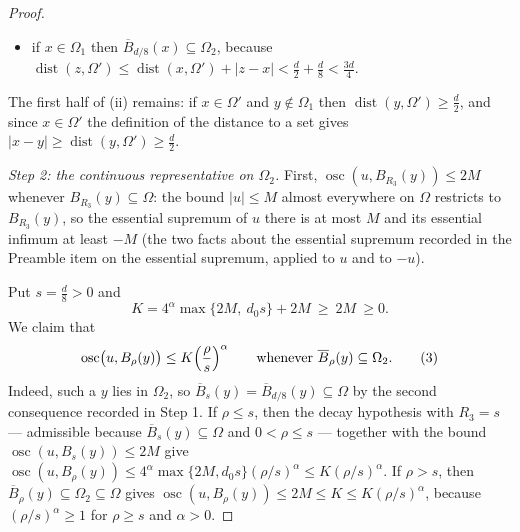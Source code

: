 \begin{proof}
\begin{itemize}
  place of $\frac{3d}4$.  Together with the first item this gives
  $\overline{\Omega_1}\subseteq\Omega$.  Also
  $\overline{\Omega'}\subseteq\Omega_1$, since every point of
  $\overline{\Omega'}$ has distance $0$ from $\Omega'$; with the boundedness of
  $\Omega_1$ and $\overline{\Omega_1}\subseteq\Omega$ this is (i).
\item if $x\in\Omega_1$ then $\overline B_{d/8}(x)\subseteq\Omega_2$, because
  $\operatorname{dist}(z,\Omega')\le\operatorname{dist}(x,\Omega')+|z-x|
  <\frac d2+\frac d8<\frac{3d}4$.
\end{itemize}
The first half of (ii) remains: if $x\in\Omega'$ and $y\notin\Omega_1$ then
$\operatorname{dist}(y,\Omega')\ge\frac d2$, and since $x\in\Omega'$ the
definition of the distance to a set gives
$|x-y|\ge\operatorname{dist}(y,\Omega')\ge\frac d2$.

\emph{Step 2: the continuous representative on $\Omega_2$.}  First,
$\operatorname*{osc}(u,B_{R_3}(y))\le2M$ whenever $B_{R_3}(y)\subseteq\Omega$:
the bound $|u|\le M$ almost everywhere on $\Omega$ restricts to $B_{R_3}(y)$,
so the essential supremum of $u$ there is at most $M$ and its essential infimum
at least $-M$ (the two facts about the essential supremum recorded in the
Preamble item on the essential supremum, applied to $u$ and to $-u$).

Put $s=\frac d8>0$ and
\[
K=4^\alpha\max\{2M,\ d_0s\}+2M\ \ge\ 2M\ \ge0 .
\]
We claim that
\[
\operatorname*{osc}\bigl(u,B_\rho(y)\bigr)\le K\Bigl(\frac\rho s\Bigr)^\alpha
\qquad\text{whenever }\overline B_\rho(y)\subseteq\Omega_2 .
\tag{3}
\]
Indeed, such a $y$ lies in $\Omega_2$, so
$\overline B_s(y)=\overline B_{d/8}(y)\subseteq\Omega$ by the second
consequence recorded in Step 1.  If $\rho\le s$, then the decay hypothesis with
$R_3=s$ --- admissible because $\overline B_s(y)\subseteq\Omega$ and
$0<\rho\le s$ --- together with the bound
$\operatorname*{osc}(u,B_s(y))\le2M$ give
$\operatorname*{osc}(u,B_\rho(y))\le4^\alpha\max\{2M,d_0s\}(\rho/s)^\alpha
\le K(\rho/s)^\alpha$.  If $\rho>s$, then
$\overline B_\rho(y)\subseteq\Omega_2\subseteq\Omega$ gives
$\operatorname*{osc}(u,B_\rho(y))\le2M\le K\le K(\rho/s)^\alpha$, because
$(\rho/s)^\alpha\ge1$ for $\rho\ge s$ and $\alpha>0$.


\end{proof}
